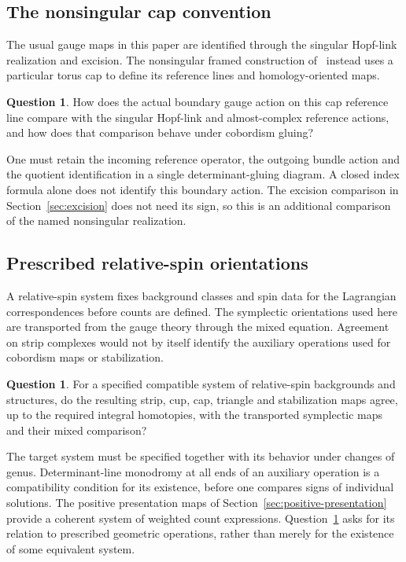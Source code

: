 \documentclass[11pt]{amsart}
\theoremstyle{definition}
\newtheorem{question}[theorem]{Question}
\theoremstyle{remark}
\theoremstyle{plain}
\begin{document}
\subsection{The nonsingular cap convention}
The usual gauge maps in this paper are identified through the
singular Hopf-link realization and excision. The nonsingular
framed construction of~\cite[Sections~7.1--7.3]{Scaduto} instead
uses a particular torus cap to define its reference lines and
homology-oriented maps.

\begin{question}\label{question:cap}
How does the actual boundary gauge action on this cap reference
line compare with the singular Hopf-link and almost-complex
reference actions, and how does that comparison behave under
cobordism gluing?
\end{question}

One must retain the incoming reference operator, the outgoing
bundle action and the quotient identification in a single
determinant-gluing diagram. A closed index formula alone does
not identify this boundary action. The excision comparison in
Section~\ref{sec:excision} does not need its sign, so this is
an additional comparison of the named nonsingular realization.

\subsection{Prescribed relative-spin orientations}
A relative-spin system fixes background classes and spin data
for the Lagrangian correspondences before counts are defined.
The symplectic orientations used here are transported from the
gauge theory through the mixed equation. Agreement on strip
complexes would not by itself identify the auxiliary operations
used for cobordism maps or stabilization.

\begin{question}\label{question:relative-spin}
For a specified compatible system of relative-spin backgrounds
and structures, do the resulting strip, cup, cap, triangle and
stabilization maps agree, up to the required integral homotopies,
with the transported symplectic maps and their mixed comparison?
\end{question}

The target system must be specified together with its behavior
under changes of genus. Determinant-line monodromy at all ends
of an auxiliary operation is a compatibility condition for its
existence, before one compares signs of individual solutions.
The positive presentation maps of
Section~\ref{sec:positive-presentation} provide a coherent system
of weighted count expressions. Question~\ref{question:relative-spin}
asks for its relation to prescribed geometric operations, rather
than merely for the existence of some equivalent system.
\end{document}
